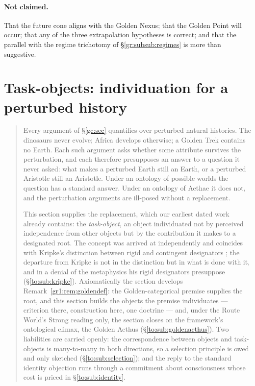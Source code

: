 \documentclass[11pt]{article}
\numberwithin{equation}{section}
\theoremstyle{plain}
\theoremstyle{definition}
\theoremstyle{remark}
\begin{document}
\paragraph{Not claimed.} That the future cone aligns with the Golden
Nexus; that the Golden Point will occur; that any of the three
extrapolation hypotheses is correct; and that the parallel with the
regime trichotomy of \S\ref{gr:subsub:regimes} is more than suggestive.

\section{Task-objects: individuation for a perturbed history}
\label{to:sec}

\begin{quote}\small
Every argument of \S\ref{gc:sec} quantifies over perturbed natural
histories. The dinosaurs never evolve; Africa develops otherwise; a
Golden Trek contains no Earth. Each such argument asks whether some
attribute survives the perturbation, and each therefore presupposes an
answer to a question it never asked: what makes a perturbed Earth still
an Earth, or a perturbed Aristotle still an Aristotle. Under an ontology
of possible worlds the question has a standard answer. Under an ontology
of Aethae it does not, and the perturbation arguments are ill-posed
without a replacement.

This section supplies the replacement, which our earliest dated
work already contains: the \emph{task-object}, an object individuated
not by perceived independence from other objects but by the contribution
it makes to a designated root. The concept was arrived at
independently and coincides with Kripke's distinction between rigid and
contingent designators \cite{kripke1980naming}; the departure from Kripke is
not in the distinction but in what is done with it, and in a denial of
the metaphysics his rigid designators presuppose
(\S\ref{to:sub:kripke}). Axiomatically the section develops
Remark~\ref{gr1:rem:goldendef}: the Golden-categorical premise
supplies the root, and this section builds the objects the premise
individuates --- criterion there, construction here, one doctrine ---
and, under the Route World's Strong reading only, the section closes
on the framework's ontological climax, the Golden Aethus
(\S\ref{to:sub:goldenaethus}).
Two liabilities are carried openly: the
correspondence between objects and task-objects is many-to-many in both
directions, so a selection principle is owed and only sketched
(\S\ref{to:sub:selection}); and the reply to the standard identity
objection runs through a commitment about consciousness whose cost is
priced in \S\ref{to:sub:identity}.
\end{quote}
\end{document}
